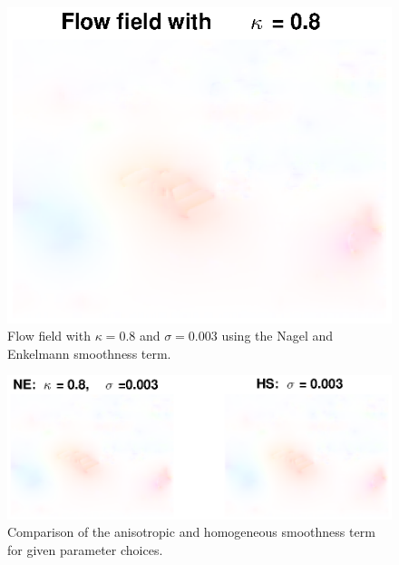 \documentclass[10pt,a4paper]{article}
\begin{document}
\begin{figure}
    \centering
    \includegraphics[scale=0.8]{NEregu}
    \caption{Flow field with $\kappa= 0.8$ and $\sigma = 0.003$ using the Nagel and Enkelmann smoothness term.}
    \label{reguNE_best}
\end{figure}

\begin{figure}
    \centering
    \includegraphics[scale=0.8]{reguNEHS.eps}
	\caption{Comparison of the anisotropic and homogeneous smoothness term for given parameter choices.\label{humans}}
    \label{reguNEHS}
\end{figure}
\end{document}
